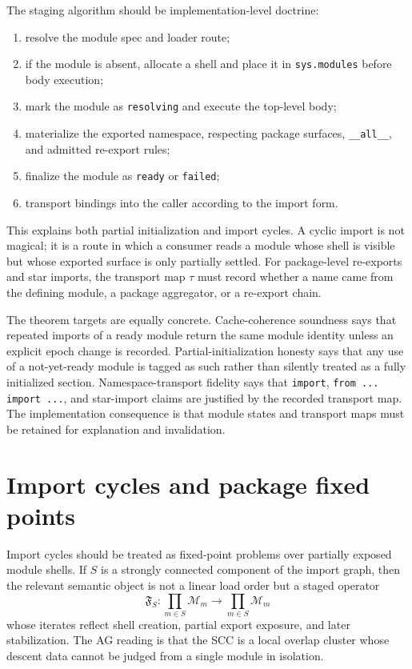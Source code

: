\documentclass[11pt]{report}
\begin{document}
The staging algorithm should be implementation-level doctrine:
\begin{enumerate}
\item resolve the module spec and loader route;
\item if the module is absent, allocate a shell and place it in \texttt{sys.modules} before body execution;
\item mark the module as \texttt{resolving} and execute the top-level body;
\item materialize the exported namespace, respecting package surfaces, \texttt{\_\_all\_\_}, and admitted re-export rules;
\item finalize the module as \texttt{ready} or \texttt{failed};
\item transport bindings into the caller according to the import form.
\end{enumerate}
This explains both partial initialization and import cycles. A cyclic import is not magical; it is a route in which a consumer reads a module whose shell is visible but whose exported surface is only partially settled. For package-level re-exports and star imports, the transport map $\tau$ must record whether a name came from the defining module, a package aggregator, or a re-export chain.

The theorem targets are equally concrete. Cache-coherence soundness says that repeated imports of a ready module return the same module identity unless an explicit epoch change is recorded. Partial-initialization honesty says that any use of a not-yet-ready module is tagged as such rather than silently treated as a fully initialized section. Namespace-transport fidelity says that \texttt{import}, \texttt{from ... import ...}, and star-import claims are justified by the recorded transport map. The implementation consequence is that module states and transport maps must be retained for explanation and invalidation.
\section{Import cycles and package fixed points}
Import cycles should be treated as fixed-point problems over partially exposed module shells. If $S$ is a strongly connected component of the import graph, then the relevant semantic object is not a linear load order but a staged operator
\[
\mathfrak{F}_S : \prod_{m \in S}\mathcal{M}_m \to \prod_{m \in S}\mathcal{M}_m
\]
whose iterates reflect shell creation, partial export exposure, and later stabilization. The AG reading is that the SCC is a local overlap cluster whose descent data cannot be judged from a single module in isolation.
\end{document}
